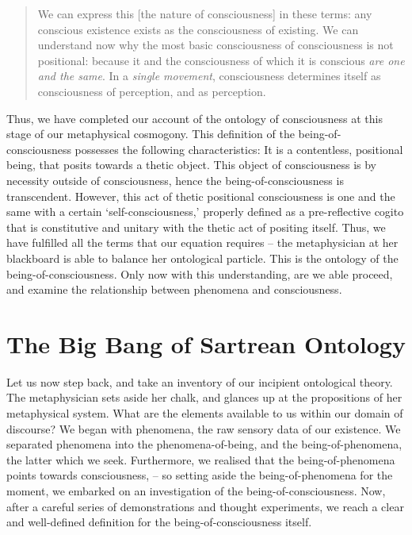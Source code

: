 \blockcquote[12]{Sartre}{%
    We can express this [the nature of consciousness] in these terms: any conscious existence exists as the consciousness of existing. We can understand now why the most basic consciousness of consciousness is not positional: because it and the consciousness of which it is conscious \emph{are one and the same}. In a \emph{single movement}, consciousness determines itself as consciousness of perception, and as perception.
}

\noindent
Thus, we have completed our account of the ontology of consciousness at this stage of our metaphysical cosmogony. This definition of the being-of-consciousness possesses the following characteristics: It is a contentless, positional being, that posits towards a thetic object. This object of consciousness is by necessity outside of consciousness, hence the being-of-consciousness is transcendent. However, this act of thetic positional consciousness is one and the same with a certain \enquote*{self-consciousness,} properly defined as a pre-reflective cogito that is constitutive and unitary with the thetic act of positing itself. Thus, we have fulfilled all the terms that our equation requires -- the metaphysician at her blackboard is able to balance her ontological particle. This is the ontology of the being-of-consciousness. Only now with this understanding, are we able proceed, and examine the relationship between phenomena and consciousness.


\section{The Big Bang of Sartrean Ontology}


Let us now step back, and take an inventory of our incipient ontological theory. The metaphysician sets aside her chalk, and glances up at the propositions of her metaphysical system. What are the elements available to us within our domain of discourse? We began with phenomena, the raw sensory data of our existence. We separated phenomena into the phenomena-of-being, and the being-of-phenomena, the latter which we seek. Furthermore, we realised that the being-of-phenomena points towards consciousness, -- so setting aside the being-of-phenomena for the moment, we embarked on an investigation of the being-of-consciousness. Now, after a careful series of demonstrations and thought experiments, we reach a clear and well-defined definition for the being-of-consciousness itself. 

